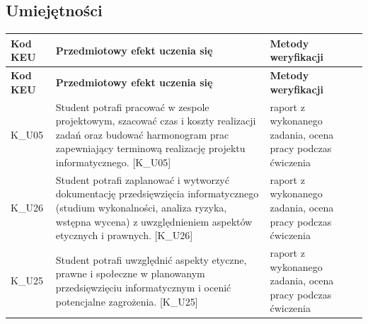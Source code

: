\documentclass[12pt, a4paper]{article}
\newcommand{\thdrule}{\noalign{\global\setlength{\extrarowheight}{0pt}}}
\newcommand{\thdend}{\noalign{\global\setlength{\extrarowheight}{3pt}}}
\begin{document}
\subsection*{Umiejętności}
{\scriptsize
\begin{longtable}{m{1.6cm}m{9.0cm}m{4.2cm}}
\thdrule\toprule
\rowcolor{pjatkRed} {\color{white}\footnotesize\textbf{\vphantom{Ag}Kod KEU}} & {\color{white}\footnotesize\textbf{\vphantom{Ag}Przedmiotowy efekt uczenia się}} & {\color{white}\footnotesize\textbf{\vphantom{Ag}Metody weryfikacji}} \\
\midrule\thdend
\endfirsthead
\thdrule\toprule
\rowcolor{pjatkRed} {\color{white}\footnotesize\textbf{\vphantom{Ag}Kod KEU}} & {\color{white}\footnotesize\textbf{\vphantom{Ag}Przedmiotowy efekt uczenia się}} & {\color{white}\footnotesize\textbf{\vphantom{Ag}Metody weryfikacji}} \\
\midrule\thdend
\endhead
  \rowcolor{tableRowLight} K\_U05 & Student potrafi pracować w zespole projektowym, szacować czas i koszty realizacji zadań oraz budować harmonogram prac zapewniający terminową realizację projektu informatycznego. {[}K\_U05{]} & raport z wykonanego zadania, ocena pracy podczas ćwiczenia \\
  \rowcolor{tableRowAlt} K\_U26 & Student potrafi zaplanować i wytworzyć dokumentację przedsięwzięcia informatycznego (studium wykonalności, analiza ryzyka, wstępna wycena) z uwzględnieniem aspektów etycznych i prawnych. {[}K\_U26{]} & raport z wykonanego zadania, ocena pracy podczas ćwiczenia \\
  \rowcolor{tableRowLight} K\_U25 & Student potrafi uwzględnić aspekty etyczne, prawne i społeczne w planowanym przedsięwzięciu informatycznym i ocenić potencjalne zagrożenia. {[}K\_U25{]} & raport z wykonanego zadania, ocena pracy podczas ćwiczenia \\
\bottomrule
\end{longtable}}
\end{document}
